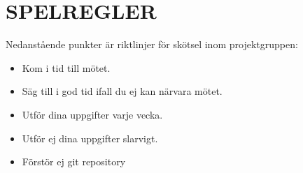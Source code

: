 \documentclass[a4paper]{article}
\begin{document}
\section{SPELREGLER}
\label{sec:spelregler}
Nedanstående punkter är riktlinjer för skötsel inom projektgruppen:

\begin{itemize}
	\item Kom i tid till mötet.
	\item Säg till i god tid ifall du ej kan närvara mötet.
	\item Utför dina uppgifter varje vecka.
	\item Utför ej dina uppgifter slarvigt.
	\item Förstör ej git repository
\end{itemize}



%
%
\end{document}
